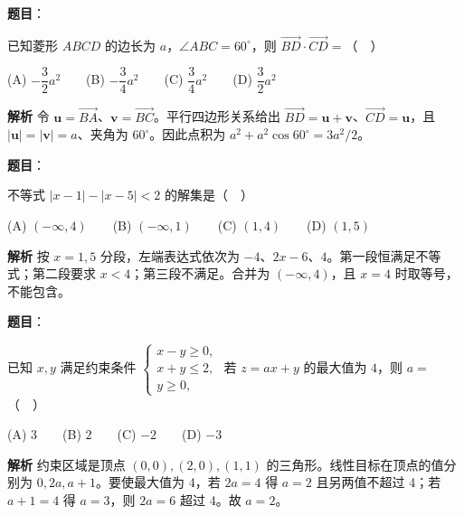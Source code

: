\begin{answer}

\textbf{题目}：

已知菱形 $ABCD$ 的边长为 $a$，$\angle ABC=60^\circ$，则 $\overrightarrow{BD}\cdot\overrightarrow{CD}=$（　）

(A) $-\dfrac{3}{2}a^2$　　(B) $-\dfrac{3}{4}a^2$　　(C) $\dfrac{3}{4}a^2$　　(D) $\dfrac{3}{2}a^2$

\textbf{解析}
令 $\mathbf u=\overrightarrow{BA}$、$\mathbf v=\overrightarrow{BC}$。平行四边形关系给出 $\overrightarrow{BD}=\mathbf u+\mathbf v$、$\overrightarrow{CD}=\mathbf u$，且 $|\mathbf u|=|\mathbf v|=a$、夹角为 $60^\circ$。因此点积为 $a^2+a^2\cos60^\circ=3a^2/2$。


\end{answer}
\begin{answer}

\textbf{题目}：

不等式 $|x-1|-|x-5|<2$ 的解集是（　）

(A) $(-\infty,4)$　　(B) $(-\infty,1)$　　(C) $(1,4)$　　(D) $(1,5)$

\textbf{解析}
按 $x=1,5$ 分段，左端表达式依次为 $-4$、$2x-6$、$4$。第一段恒满足不等式；第二段要求 $x<4$；第三段不满足。合并为 $(-\infty,4)$，且 $x=4$ 时取等号，不能包含。


\end{answer}
\begin{answer}

\textbf{题目}：

已知 $x,y$ 满足约束条件 $\begin{cases}x-y\geqslant 0,\\x+y\leqslant 2,\\y\geqslant 0,\end{cases}$ 若 $z=ax+y$ 的最大值为 $4$，则 $a=$（　）

(A) $3$　　(B) $2$　　(C) $-2$　　(D) $-3$

\textbf{解析}
约束区域是顶点 $(0,0),(2,0),(1,1)$ 的三角形。线性目标在顶点的值分别为 $0,2a,a+1$。要使最大值为 4，若 $2a=4$ 得 $a=2$ 且另两值不超过 4；若 $a+1=4$ 得 $a=3$，则 $2a=6$ 超过 4。故 $a=2$。


\end{answer}
